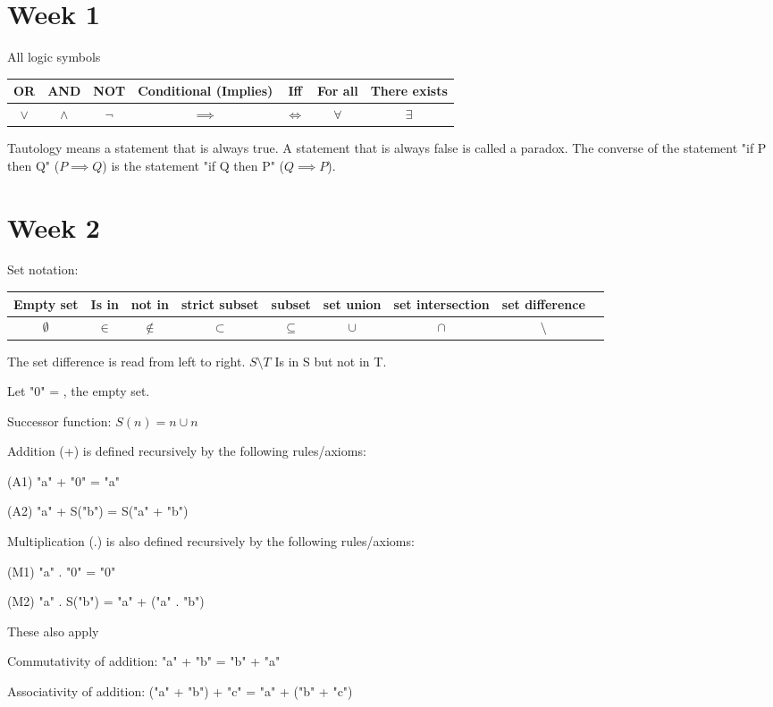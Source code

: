 \documentclass{article}
\begin{document}
\section{Week 1}
All logic symbols
\begin{table}[H]
    \centering
    \begin{tabular}{ c|c|c|c|c|c|c } 
        OR & AND & NOT & Conditional (Implies) & Iff & For all & There exists\\
        \hline
        \(\lor\) & \(\land\) & \(\neg\) & \(\implies\) & \(\iff\) & \(\forall\) & \(\exists\)\\
    \end{tabular}
\end{table}
Tautology means a statement that is always true. A statement that is always false is called a paradox.
The converse of the statement "if P then Q" (\(P \implies Q\)) is the statement "if Q then P" (\(Q \implies P\)).
\section{Week 2}
Set notation:
\begin{table}[H]
    \centering
    \begin{tabular}{c|c|c|c|c|c|c|c|c}
    Empty set & Is in & not in & strict subset & subset & set union & set intersection & set difference\\
    \hline
    \(\emptyset\) & \(\in\) & \(\notin\) & \(\subset\) & \(\subseteq\) & \(\cup\) & \(\cap\) & \(\setminus\)
    \end{tabular}
\end{table}
The set difference is read from left to right. \(S\setminus T\) Is in S but not in T.

Let "0" = {}, the empty set.

Successor function: \(S(n) = n \cup {n}\)

Addition (+) is defined recursively by the following rules/axioms:

(A1) "a" + "0" = "a"

(A2) "a" + S("b") = S("a" + "b")

Multiplication (.) is also defined recursively by the following rules/axioms:

(M1) "a" . "0" = "0"

(M2) "a" . S("b") = "a" + ("a" . "b")

These also apply

Commutativity of addition: "a" + "b" = "b" + "a"

Associativity of addition: ("a" + "b") + "c" = "a" + ("b" + "c")
\end{document}
